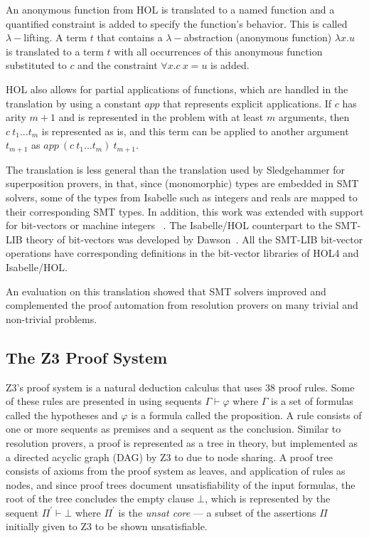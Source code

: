 \documentclass{article}
\begin{document}
		An anonymous function from HOL is translated 
		to a named function and a quantified constraint
		is added to specify the function's behavior.
		This is called $\lambda-$lifting.
		A term $t$ that contains a $\lambda-$abstraction
		(anonymous function) $\lambda x.u$ is translated 
		to a term $t$ with all occurrences of this 
		anonymous function substituted to $c$ and 
		the constraint $\forall x. c\ x = u$ is added.

		HOL also allows for partial applications of 
		functions, which are handled in the translation
		by using a constant $app$ that represents 
		explicit applications. If $c$ has arity 
		$m+1$ and is represented in the problem 
		with at least $m$ arguments, then 
		$c\ t_1 ... t_m$ is represented as is, 
		and this term can be applied to another 
		argument $t_{m+1}$ as 
		$app\ (c\ t_1 ... t_m)\ t_{m+1}$.
		
		The translation is less general than the 
		translation used by Sledgehammer for 
		superposition provers, in that, since (monomorphic) 
		types are embedded in SMT solvers, some of the 
		types from Isabelle such as integers and reals 
		are mapped to their corresponding SMT types.
		In addition, this work was extended with 
		support for bit-vectors or machine integers
		~\cite{10.1007/978-3-642-25379-9_15}. The 
		Isabelle/HOL counterpart to the SMT-LIB 
		theory of bit-vectors was developed by 
		Dawson~\cite{DAWSON200955}. All the SMT-LIB
		bit-vector operations have corresponding 
		definitions in the bit-vector libraries of 
		HOL4 and Isabelle/HOL.
		
		An evaluation on this translation showed that SMT 
		solvers improved and complemented the proof automation 
		from resolution provers on many trivial and non-trivial 
		problems.
		
	\subsection{The Z3 Proof System}
		Z3's proof system is a natural deduction 
		calculus that uses 38 proof rules. Some of 
		these rules are presented in 
		using sequents $\Gamma \vdash \varphi$ where 
		$\Gamma$ is a set of formulas called the hypotheses
		and $\varphi$ is a formula called the proposition. 
		A rule consists of one or more sequents as 
		premises and a sequent as the conclusion. 
		Similar to resolution provers, a proof is 
		represented as a tree in theory, but implemented 
		as a directed acyclic graph (DAG) by Z3 to 
		due to node sharing. A proof tree consists of axioms 
		from the proof system as leaves, and application 
		of rules as nodes, and since proof trees 
		document unsatisfiability of the input 
		formulas, the root of the tree concludes the 
		empty clause $\bot$, which is represented by 
		the sequent $\Pi^\prime \vdash \bot$ where 
		$\Pi^\prime$ is the \textit{unsat core} --- 
		a subset of the assertions $\Pi$
		initially given to Z3 to be shown unsatisfiable.
		
\end{document}
